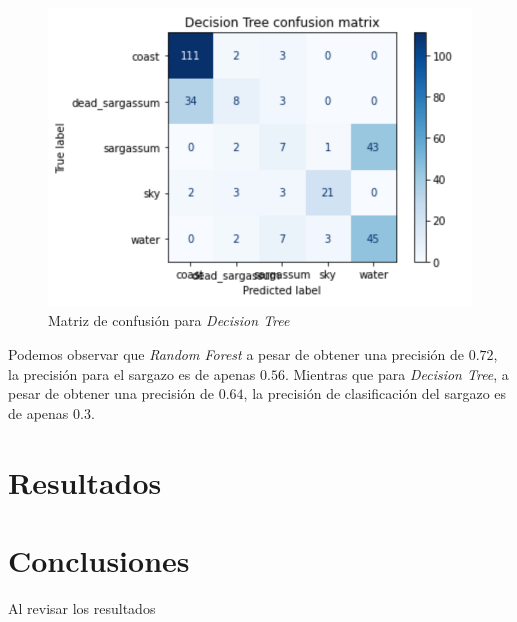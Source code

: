 \documentclass[conference]{IEEEtran}
\begin{document}
\begin{itemize}
		\begin{figure}[H]
		    \centering
		    \includegraphics[scale=0.4]{imgs/dt_confusion_mat.png}
		    \caption{Matriz de confusión para \textit{Decision Tree}}
		    \label{fig:dt_cm}
		\end{figure}
		
\end{itemize}


Podemos observar que \textit{Random Forest} a pesar de obtener una precisión de $0.72$, la precisión para el sargazo es de apenas $0.56$. Mientras que para \textit{Decision Tree}, a pesar de obtener una precisión de $0.64$, la precisión de clasificación del sargazo es de apenas $0.3$.


\section{Resultados}


\section{Conclusiones}

Al revisar los resultados 


\end{document}
